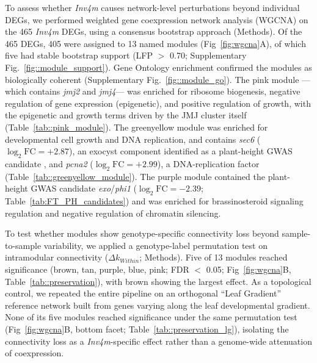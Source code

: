 \documentclass[9pt,twocolumn,twoside]{rilabRxiv}
\newcommand{\invfour}{\textit{Inv4m}\xspace}
\newcommand{\jmjii}{\textit{jmj2}\xspace}
\newcommand{\jmjiv}{\textit{jmj4}\xspace}
\begin{document}
To assess whether \invfour causes network-level perturbations beyond individual DEGs, we performed weighted gene coexpression network analysis (WGCNA) \citep{shahan2018} on the 465 \invfour DEGs, using a consensus bootstrap approach (Methods).
Of the 465 DEGs, 405 were assigned to 13 named modules (Fig~\ref{fig:wgcna}A), of which five had stable bootstrap support (LFP $>$ 0.70; Supplementary Fig.~\ref{fig::module_support}). 
Gene Ontology enrichment confirmed the modules as biologically coherent (Supplementary Fig.~\ref{fig::module_go}). 
The pink module --- which contains \jmjii and \jmjiv --- was enriched for ribosome biogenesis, negative regulation of gene expression (epigenetic), and positive regulation of growth, with the epigenetic and growth terms driven by the JMJ cluster itself (Table~\ref{tab::pink_module}). 
The greenyellow module was enriched for developmental cell growth and DNA replication, and contains \textit{sec6} ($\log_2\text{FC} = +2.87$), an exocyst component identified as a plant-height GWAS candidate \citep{peiffer2014}, and \textit{pcna2} ($\log_2\text{FC} = +2.99$), a DNA-replication factor (Table~\ref{tab::greenyellow_module}). 
The purple module contained the plant-height GWAS candidate
\textit{exo}/\textit{phi1} ($\log_2\text{FC} = -2.39$; Table~\ref{tab:FT_PH_candidates}) and was enriched for brassinosteroid signaling regulation and negative regulation of chromatin silencing.

To test whether modules show genotype-specific connectivity loss beyond sample-to-sample variability, we applied a genotype-label permutation test on intramodular connectivity ($\Delta k_{Within}$; Methods). Five of 13 modules reached significance (brown, tan, purple, blue, pink; FDR $<$ 0.05; Fig~\ref{fig:wgcna}B, Table~\ref{tab::preservation}), with brown showing the largest effect.
As a topological control, we repeated the entire pipeline on an orthogonal ``Leaf Gradient'' reference network built from genes varying along the leaf developmental gradient. None of its five modules reached significance under the same permutation test (Fig~\ref{fig:wgcna}B, bottom facet; Table~\ref{tab::preservation_lg}), isolating the connectivity loss as a \invfour-specific effect rather than a genome-wide attenuation of coexpression.
\end{document}
